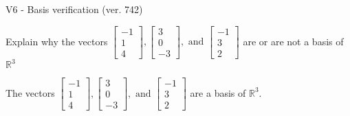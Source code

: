 \begin{exercise}
  \begin{exerciseTitle}V6 - Basis verification (ver. 742)\end{exerciseTitle}
  \begin{exerciseStatement}
    Explain why the vectors \(\left[\begin{array}{r}
-1 \\
1 \\
4
\end{array}\right] , \left[\begin{array}{r}
3 \\
0 \\
-3
\end{array}\right] , \text{ and } \left[\begin{array}{r}
-1 \\
3 \\
2
\end{array}\right]\) are or are not a basis of \(\mathbb{R}^3\)	


  \end{exerciseStatement}
  \begin{exerciseAnswer}
   The vectors \(\left[\begin{array}{r}
-1 \\
1 \\
4
\end{array}\right] , \left[\begin{array}{r}
3 \\
0 \\
-3
\end{array}\right] , \text{ and } \left[\begin{array}{r}
-1 \\
3 \\
2
\end{array}\right]\) 
  	 are  a basis of \(\mathbb{R}^3\).
  


  \end{exerciseAnswer}
\end{exercise}